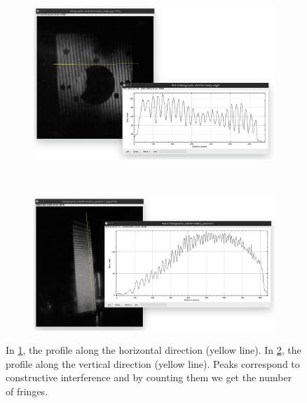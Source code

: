 \documentclass[11pt,a4paper]{article}
\begin{document}
\begin{figure}[ht]
\centering
\begin{subfigure}[b]{0.4\textwidth}
\includegraphics[width=\textwidth]{Holographic_interferometry_angle_fringes}
\caption{}
\label{fig:holographic_interferometry_angle_fringes}
\end{subfigure}\\\vspace{.1cm}
\begin{subfigure}[b]{0.4\textwidth}
\includegraphics[width=\textwidth]{Holographic_interferometry_position_fringes}
\caption{}
\label{fig:holographic_interferometry_position_fringes}
\end{subfigure}
\caption{In \ref{fig:holographic_interferometry_angle_fringes}, the profile along the horizontal direction (yellow line). In \ref{fig:holographic_interferometry_position_fringes}, the profile along the vertical direction (yellow line). Peaks correspond to constructive interference and by counting them we get the number of fringes.}
\label{fig:profile_measurements}
\end{figure}
\end{document}
